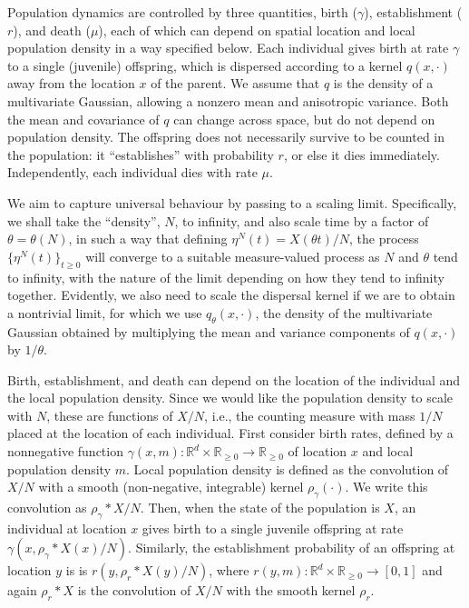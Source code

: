 \documentclass[EJP]{ejpecp} %
\newcommand{\IR}{\mathbb R}
\newcommand{\kernel}{\rho}  %
\newcommand{\smooth}[1]{\kernel_{#1} \! * \!}  %
\begin{document}
Population dynamics are controlled by three quantities,
birth ($\gamma$), establishment ($r$), and death ($\mu$),
each of which can depend on spatial location and local population density
in a way specified below.
Each individual gives birth at rate $\gamma$ to a single (juvenile) offspring,
which is dispersed according to a kernel $q(x, \cdot)$ away from the location $x$ of the parent.
We assume that $q$ is the density of a multivariate Gaussian,
allowing a nonzero mean and anisotropic variance.
Both the mean and covariance of $q$ can change across space,
but do not depend on population density.
The offspring does not necessarily survive to be counted in the population:
it ``establishes'' with probability $r$,
or else it dies immediately.
Independently, each individual dies with rate $\mu$.

We aim to capture universal behaviour by passing to a scaling limit. Specifically, 
we shall take the ``density'', $N$, to infinity,
and also scale time by a factor of $\theta = \theta(N)$,
in such a way that defining $\eta^N(t) = X(\theta t) / N$,
the process $\{\eta^N(t)\}_{t \ge 0}$
will converge to a suitable measure-valued process
as $N$ and $\theta$ tend to infinity,
with the nature of the limit depending on how they tend to infinity together.
Evidently, we also need to scale the dispersal kernel if we are to obtain a
nontrivial limit, for which we use $q_\theta(x,\cdot)$,
the density of the multivariate Gaussian obtained by
multiplying the mean and variance components of $q(x,\cdot)$ by $1/\theta$.

Birth, establishment, and death can depend on the location of the individual
and the local population density.
Since we would like the population density to scale with $N$,
these are functions of $X/N$, i.e.,
the counting measure with mass $1/N$ placed at the location of each individual.
First consider birth rates, defined by
a nonnegative function $\gamma(x, m) : \IR^d \times \IR_{\ge 0} \to \IR_{\ge 0}$
of location $x$ 
and local population density $m$.
Local population density is defined as the convolution of $X/N$ with 
a smooth (non-negative, integrable) kernel $\rho_\gamma(\cdot)$.
We write this convolution as $\smooth{\gamma} X/N$.
Then, when the state of the population is $X$, an individual at location $x$ 
gives birth to a single juvenile offspring at rate
$\gamma(x, \smooth{\gamma} X(x) / N)$.
Similarly, the establishment probability of an offspring at location $y$ is
is $r(y, \smooth{r} X(y) / N)$,
where $r(y, m) : \IR^d \times \IR_{\ge 0} \to [0, 1]$
and again $\smooth{r} X$ is the convolution of 
$X/N$ with the smooth kernel $\rho_r$.
\end{document}
